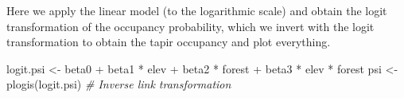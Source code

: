 \documentclass[
]{book}
\newenvironment{Shaded}{\begin{snugshade}}{\end{snugshade}}
\newcommand{\CommentTok}[1]{\textcolor[rgb]{0.56,0.35,0.01}{\textit{#1}}}
\newcommand{\FunctionTok}[1]{\textcolor[rgb]{0.00,0.00,0.00}{#1}}
\newcommand{\NormalTok}[1]{#1}
\newcommand{\OtherTok}[1]{\textcolor[rgb]{0.56,0.35,0.01}{#1}}
\newcommand{\SpecialCharTok}[1]{\textcolor[rgb]{0.00,0.00,0.00}{#1}}
\begin{document}
Here we apply the linear model (to the logarithmic scale) and obtain the logit transformation of the occupancy probability, which we invert with the logit transformation to obtain the tapir occupancy and plot everything.

\begin{Shaded}
\begin{Highlighting}[]
\NormalTok{logit.psi }\OtherTok{\textless{}{-}}\NormalTok{ beta0 }\SpecialCharTok{+}\NormalTok{ beta1 }\SpecialCharTok{*}\NormalTok{ elev }\SpecialCharTok{+}\NormalTok{ beta2 }\SpecialCharTok{*}\NormalTok{ forest }\SpecialCharTok{+}\NormalTok{ beta3 }\SpecialCharTok{*}\NormalTok{ elev }\SpecialCharTok{*}\NormalTok{ forest}
\NormalTok{psi }\OtherTok{\textless{}{-}} \FunctionTok{plogis}\NormalTok{(logit.psi)      }\CommentTok{\# Inverse link transformation}


\end{Highlighting}
\end{Shaded}
\end{document}
